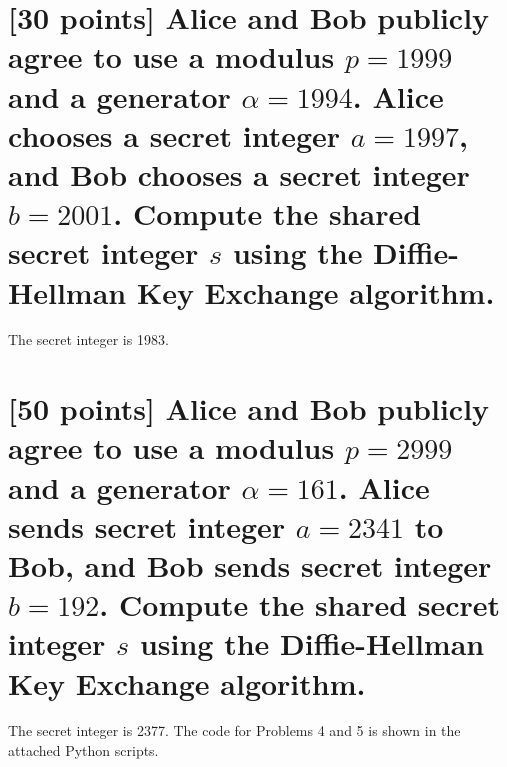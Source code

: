 \documentclass{article}
\begin{document}
\section{[30 points] Alice and Bob publicly agree to use a modulus $p=1999$ and a generator $\alpha=1994$. Alice chooses a secret integer $a= 1997$, and Bob chooses a secret integer $b =  2001$. Compute the shared secret integer $s$ using the Diffie-Hellman Key Exchange algorithm. }

The secret integer is  1983.

\section{[50 points] Alice and Bob publicly agree to use a modulus $p=2999$ and a generator $\alpha=161$. Alice sends  secret integer $a= 2341$ to Bob, and Bob sends secret integer $b =  192$. Compute the shared secret integer $s$ using the Diffie-Hellman Key Exchange algorithm. }

The secret integer is 2377.
The code for Problems 4 and 5 is shown in the attached Python scripts.
\end{document}
